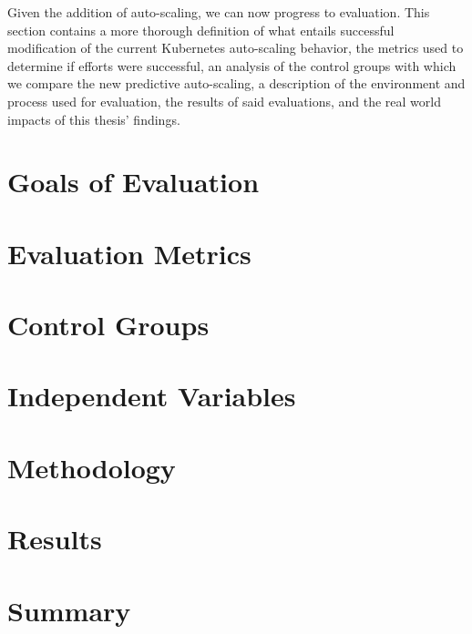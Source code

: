 Given the addition of auto-scaling, we can now progress to
evaluation. This section contains a more thorough definition of what entails
successful modification of the current Kubernetes auto-scaling behavior, the metrics
used to determine if efforts were successful, an analysis of the control groups
with which we compare the new predictive auto-scaling, a description of
the environment and process used for evaluation, the results of said
evaluations, and the real world impacts of this thesis' findings.

\section{Goals of Evaluation}



\section{Evaluation Metrics}



\section{Control Groups}



\section{Independent Variables}



\section{Methodology}



\section{Results}
\label{evaluation-results}



\section{Summary}


